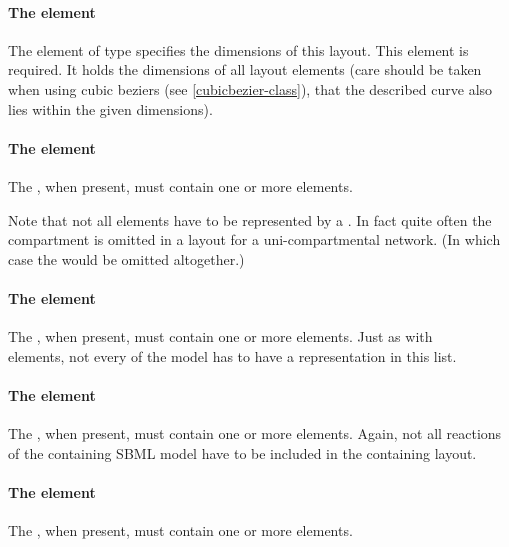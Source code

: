 \paragraph{The  element}
The  element of type \Dimensions specifies the 
dimensions of this layout. This element is required. It holds the 
dimensions of all layout elements (care should be taken when using cubic 
beziers (see \ref{cubicbezier-class}), that the described curve also lies 
within the given dimensions). 


\paragraph{The  element}
\label{listofcompartmentglyphs-class}
The , when present, must contain one or 
more \CompartmentGlyph elements. 

Note that not all \Compartment elements have to be represented by a 
\CompartmentGlyph. In fact quite often the compartment is omitted 
in a layout for a uni-compartmental network. (In which case the 
\ListOfCompartmentGlyphs would be omitted altogether.)


\paragraph{The  element}
\label{listofspeciesglyphs-class}
The , when present, must contain 
one or more \SpeciesGlyph elements. Just as with \\ \CompartmentGlyph 
elements, not every \Species of the model has to have a representation 
in this list.


\paragraph{The  element}
\label{listofreactionglyphs-class}
The , when present, must contain one or more 
\ReactionGlyph elements. Again, not all reactions of the containing SBML 
model have to be included in the containing layout. 


\paragraph{The  element}
\label{listoftextglyphs-class}
The , when present, must contain one or more 
\TextGlyph elements. 


